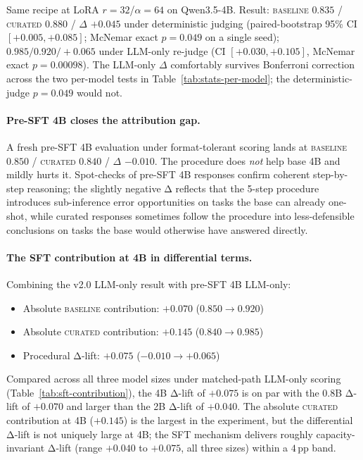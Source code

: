 \documentclass[10pt]{article}
\newcommand{\BL}{\textsc{baseline}\xspace}
\newcommand{\CU}{\textsc{curated}\xspace}
\newcommand{\Qwenf}{Qwen3.5-4B\xspace}
\begin{document}
Same recipe at LoRA $r{=}32$/$\alpha{=}64$ on \Qwenf. Result: \BL{} $0.835$ / \CU{} $0.880$ / $\Delta$ $+0.045$ under deterministic judging (paired-bootstrap 95\% CI $[+0.005, +0.085]$; McNemar exact $p{=}0.049$ on a single seed); $0.985 / 0.920 / +0.065$ under LLM-only re-judge (CI $[+0.030, +0.105]$, McNemar exact $p{=}0.00098$). The LLM-only $\Delta$ comfortably survives Bonferroni correction across the two per-model tests in Table~\ref{tab:stats-per-model}; the deterministic-judge $p{=}0.049$ would not.

\paragraph{Pre-SFT 4B closes the attribution gap.} A fresh pre-SFT 4B evaluation under format-tolerant scoring lands at \BL{} $0.850$ / \CU{} $0.840$ / $\Delta$ $-0.010$. The procedure does \emph{not} help base 4B and mildly hurts it. Spot-checks of pre-SFT 4B responses confirm coherent step-by-step reasoning; the slightly negative Δ reflects that the 5-step procedure introduces sub-inference error opportunities on tasks the base can already one-shot, while curated responses sometimes follow the procedure into less-defensible conclusions on tasks the base would otherwise have answered directly.

\paragraph{The SFT contribution at 4B in differential terms.} Combining the v2.0 LLM-only result with pre-SFT 4B LLM-only:
\begin{itemize}[leftmargin=*, nosep]
    \item Absolute \BL{} contribution: $+0.070$ ($0.850 \to 0.920$)
    \item Absolute \CU{} contribution: $+0.145$ ($0.840 \to 0.985$)
    \item Procedural Δ-lift: $+0.075$ ($-0.010 \to +0.065$)
\end{itemize}
Compared across all three model sizes under matched-path LLM-only scoring (Table~\ref{tab:sft-contribution}), the 4B Δ-lift of $+0.075$ is on par with the 0.8B Δ-lift of $+0.070$ and larger than the 2B Δ-lift of $+0.040$. The absolute \CU{} contribution at 4B ($+0.145$) is the largest in the experiment, but the differential Δ-lift is not uniquely large at 4B; the SFT mechanism delivers roughly capacity-invariant Δ-lift (range $+0.040$ to $+0.075$, all three sizes) within a $4$\,pp band.
\end{document}
